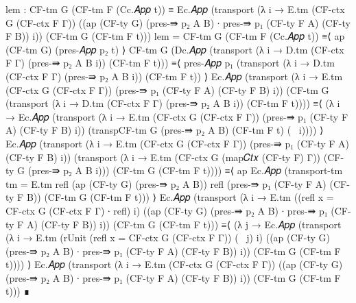 \begin{code}[hide]
    lem : CF-tm G (CF-tm F (Cc.𝐴𝑝𝑝 t))
      ≡ Ec.𝐴𝑝𝑝 (transport (λ i → E.tm (CF-ctx G (CF-ctx F Γ)) ((ap (CF-ty G) (pres-⇛ p₂ A B)
        ∙ pres-⇛ p₁ (CF-ty F A) (CF-ty F B)) i)) (CF-tm G (CF-tm F t)))
    lem =
      CF-tm G (CF-tm F (Cc.𝐴𝑝𝑝 t))
        ≡⟨ ap (CF-tm G) (pres-𝐴𝑝𝑝 p₂ t) ⟩
      CF-tm G (Dc.𝐴𝑝𝑝 (transport (λ i → D.tm (CF-ctx F Γ) (pres-⇛ p₂ A B i)) (CF-tm F t)))
        ≡⟨ pres-𝐴𝑝𝑝 p₁ (transport (λ i → D.tm (CF-ctx F Γ) (pres-⇛ p₂ A B i)) (CF-tm F t)) ⟩
      Ec.𝐴𝑝𝑝 (transport (λ i → E.tm (CF-ctx G (CF-ctx F Γ)) (pres-⇛ p₁ (CF-ty F A) (CF-ty F B) i))
        (CF-tm G (transport (λ i → D.tm (CF-ctx F Γ) (pres-⇛ p₂ A B i)) (CF-tm F t))))
        ≡⟨ (λ i → Ec.𝐴𝑝𝑝 (transport (λ i → E.tm (CF-ctx G (CF-ctx F Γ)) (pres-⇛ p₁ (CF-ty F A)
          (CF-ty F B) i)) (transpCF-tm G (pres-⇛ p₂ A B) (CF-tm F t) (~ i)))) ⟩
      Ec.𝐴𝑝𝑝 (transport (λ i → E.tm (CF-ctx G (CF-ctx F Γ)) (pres-⇛ p₁ (CF-ty F A) (CF-ty F B) i))
        (transport (λ i → E.tm (CF-ctx G (map𝐶𝑡𝑥 (CF-ty F) Γ)) (CF-ty G (pres-⇛ p₂ A B i)))
          (CF-tm G (CF-tm F t))))
        ≡⟨ ap Ec.𝐴𝑝𝑝 (transport-tm {tm = E.tm} refl (ap (CF-ty G) (pres-⇛ p₂ A B))
          refl (pres-⇛ p₁ (CF-ty F A) (CF-ty F B)) (CF-tm G (CF-tm F t))) ⟩
      Ec.𝐴𝑝𝑝 (transport (λ i → E.tm ((refl {x = CF-ctx G (CF-ctx F Γ)} ∙ refl) i)
        ((ap (CF-ty G) (pres-⇛ p₂ A B) ∙ pres-⇛ p₁ (CF-ty F A) (CF-ty F B)) i))
        (CF-tm G (CF-tm F t)))
        ≡⟨ (λ j → Ec.𝐴𝑝𝑝 (transport (λ i → E.tm (rUnit (refl {x = CF-ctx G (CF-ctx F Γ)}) (~ j) i)
          ((ap (CF-ty G) (pres-⇛ p₂ A B) ∙ pres-⇛ p₁ (CF-ty F A) (CF-ty F B)) i))
          (CF-tm G (CF-tm F t)))) ⟩
      Ec.𝐴𝑝𝑝 (transport (λ i → E.tm (CF-ctx G (CF-ctx F Γ)) ((ap (CF-ty G) (pres-⇛ p₂ A B)
        ∙ pres-⇛ p₁ (CF-ty F A) (CF-ty F B)) i)) (CF-tm G (CF-tm F t)))
        ∎
\end{code}
